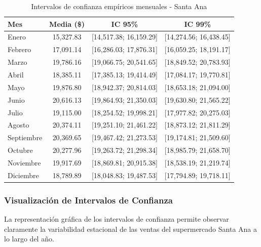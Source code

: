 \documentclass[11pt,a4paper]{article}
\begin{document}
\begin{table}[H]
\centering
\caption{Intervalos de confianza empíricos mensuales - Santa Ana}
\scriptsize
\begin{tabular}{|l|c|c|c|}
\hline
\textbf{Mes} & \textbf{Media (\$)} & \textbf{IC 95\%} & \textbf{IC 99\%} \\
\hline
Enero & 15,327.83 & [14,517.38; 16,159.29] & [14,274.56; 16,438.45] \\
Febrero & 17,091.14 & [16,286.03; 17,876.31] & [16,059.25; 18,191.17] \\
Marzo & 19,786.16 & [19,066.75; 20,541.65] & [18,849.52; 20,783.93] \\
Abril & 18,385.11 & [17,385.13; 19,414.49] & [17,084.17; 19,770.81] \\
Mayo & 19,876.80 & [18,942.37; 20,814.03] & [18,653.18; 21,094.00] \\
Junio & 20,616.13 & [19,864.93; 21,350.03] & [19,630.80; 21,565.22] \\
Julio & 19,115.00 & [18,254.52; 19,998.21] & [17,977.82; 20,275.03] \\
Agosto & 20,374.11 & [19,251.10; 21,461.22] & [18,873.12; 21,811.29] \\
Septiembre & 20,369.65 & [19,467.42; 21,273.53] & [19,174.81; 21,509.60] \\
Octubre & 20,277.96 & [19,263.72; 21,298.34] & [18,985.79; 21,658.70] \\
Noviembre & 19,917.69 & [18,869.81; 20,915.38] & [18,538.19; 21,219.74] \\
Diciembre & 18,789.89 & [18,048.83; 19,487.53] & [17,794.89; 19,718.11] \\
\hline
\end{tabular}
\end{table}

\subsubsection{Visualización de Intervalos de Confianza}

La representación gráfica de los intervalos de confianza permite observar claramente la variabilidad estacional de las ventas del supermercado Santa Ana a lo largo del año.
\end{document}
